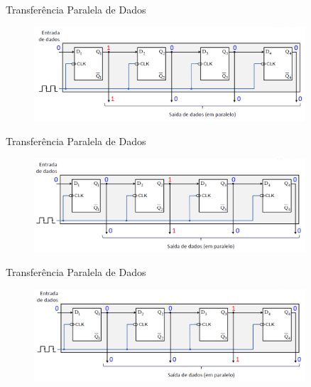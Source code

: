 \documentclass{beamer}
\begin{document}
\begin{frame}{Transferência Paralela de Dados
 }

\begin{figure}
\centering
\includegraphics[width=0.9\textwidth]{figures/par_2.png}
\end{figure}


\end{frame}


\begin{frame}{Transferência Paralela de Dados
 }

\begin{figure}
\centering
\includegraphics[width=0.9\textwidth]{figures/par_3.png}
\end{figure}


\end{frame}


\begin{frame}{Transferência Paralela de Dados
 }

\begin{figure}
\centering
\includegraphics[width=0.9\textwidth]{figures/par_4.png}
\end{figure}


\end{frame}
\end{document}

